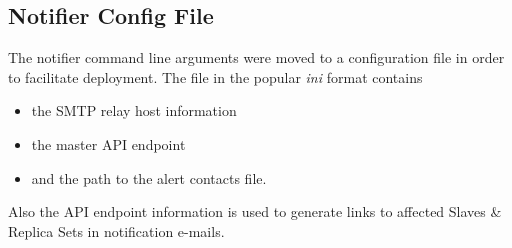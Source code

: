 \subsection{Notifier Config File}

The notifier command line arguments were moved to a configuration file in order to facilitate deployment.
The file in the popular \textit{ini} format contains

\begin{itemize}
                \item the SMTP relay host information 
                \item the master API endpoint
                \item and the path to the alert contacts file.
\end{itemize}

Also the API endpoint information is used to generate links to affected Slaves \& Replica Sets in notification e-mails.
